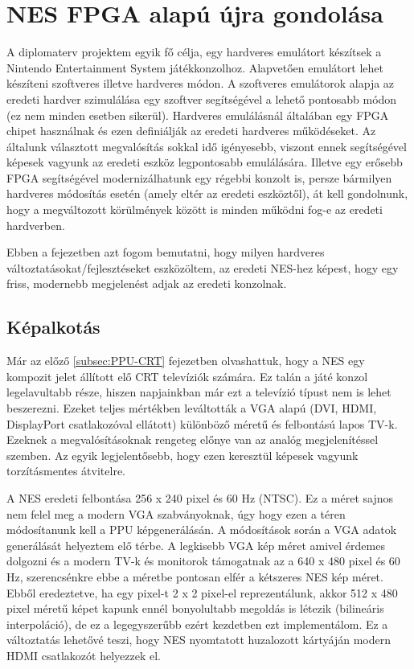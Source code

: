 \chapter{NES FPGA alapú újra gondolása}

A diplomaterv projektem egyik fő célja, egy hardveres emulátort készítsek a Nintendo Entertainment System játékkonzolhoz. Alapvetően emulátort lehet készíteni szoftveres illetve hardveres módon. A szoftveres emulátorok alapja az eredeti hardver szimulálása egy szoftver segítségével a lehető pontosabb módon (ez nem minden esetben sikerül). Hardveres emulálásnál általában egy FPGA chipet használnak és ezen definiálják az eredeti hardveres működéseket. Az általunk választott megvalósítás sokkal idő igényesebb, viszont ennek segítségével képesek vagyunk az eredeti eszköz legpontosabb emulálására. Illetve egy erősebb FPGA segítségével modernizálhatunk egy régebbi konzolt is, persze bármilyen hardveres módosítás esetén (amely eltér az eredeti eszköztől), át kell gondolnunk, hogy a megváltozott körülmények között is minden működni fog-e az eredeti hardverben. 

Ebben a fejezetben azt fogom bemutatni, hogy milyen hardveres változtatásokat/fejlesztéseket eszközöltem, az eredeti NES-hez képest, hogy egy friss, modernebb megjelenést adjak az eredeti konzolnak.

\section{Képalkotás}

Már az előző \ref{subsec:PPU-CRT} fejezetben olvashattuk, hogy a NES egy kompozit jelet állított elő CRT televíziók számára. Ez talán a játé konzol legelavultabb része, hiszen napjainkban már ezt a televízió típust nem is lehet beszerezni. Ezeket teljes mértékben leváltották a VGA alapú (DVI, HDMI, DisplayPort csatlakozóval ellátott) különböző méretű és felbontású lapos TV-k. Ezeknek a megvalósításoknak rengeteg előnye van az analóg megjelenítéssel szemben. Az egyik legjelentősebb, hogy ezen keresztül képesek vagyunk torzításmentes átvitelre.

A NES eredeti felbontása 256 x 240 pixel és 60 Hz (NTSC). Ez a  méret sajnos nem felel meg a modern VGA szabványoknak, úgy hogy ezen a téren módosítanunk kell a PPU képgenerálásán. A módosítások során a VGA adatok generálását helyeztem elő térbe. A legkisebb VGA kép méret amivel érdemes dolgozni és a modern TV-k és monitorok támogatnak az a 640 x 480 pixel és 60 Hz, szerencsénkre ebbe a méretbe pontosan elfér a kétszeres NES kép méret. Ebből eredeztetve, ha egy pixel-t 2 x 2 pixel-el reprezentálunk, akkor 512 x 480 pixel méretű képet kapunk ennél bonyolultabb megoldás is létezik (bilineáris interpoláció), de ez a legegyszerűbb ezért kezdetben ezt implementálom. Ez a változtatás lehetővé teszi, hogy NES nyomtatott huzalozott kártyáján modern HDMI csatlakozót helyezzek el. 


